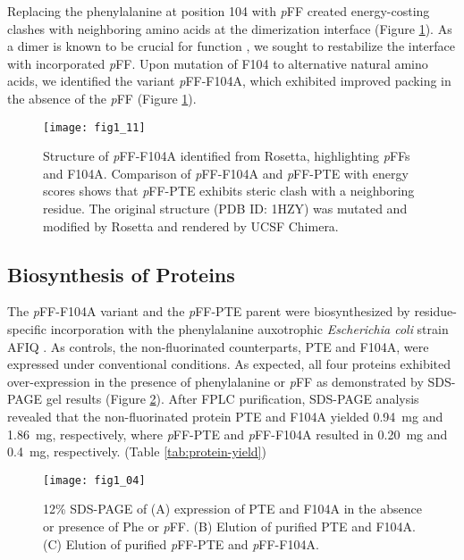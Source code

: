 \begin{refsection}
Replacing the phenylalanine at position 104 with \emph{p}FF created
energy-costing clashes with neighboring amino acids at the dimerization
interface (Figure \ref{fig:rosetta-pte}). As a dimer is known to be crucial for
function \cite{Baker2011b}, we sought to restabilize the interface with
incorporated \emph{p}FF. Upon mutation of F104 to alternative natural amino
acids, we identified the variant \emph{p}FF-F104A, which exhibited improved
packing in the absence of the \emph{p}FF (Figure \ref{fig:rosetta-pte}).
\begin{figure}[htbp] \centering \texttt{[image: fig1\_11]}
    \caption[Structure of \emph{p}FF-F104A identified from Rosetta,
        highlighting \emph{p}FFs and F104A. Comparison of \emph{p}FF-F104A and
        \emph{p}FF-PTE with energy scores shows that \emph{p}FF-PTE exhibits
        steric clash with a neighboring residue.  The original structure (PDB
        ID: 1HZY) was mutated and modified by Rosetta and rendered by UCSF
    Chimera.]{Structure of \emph{p}FF-F104A identified from Rosetta,
    highlighting \emph{p}FFs and F104A. Comparison of \emph{p}FF-F104A and
    \emph{p}FF-PTE with energy scores shows that \emph{p}FF-PTE exhibits steric
    clash with a neighboring residue. The original structure (PDB ID: 1HZY) was
    mutated and modified by Rosetta and rendered by UCSF Chimera.}
    \label{fig:rosetta-pte}
\end{figure}

\subsection{Biosynthesis of Proteins}

The \emph{p}FF-F104A variant and the \emph{p}FF-PTE parent were biosynthesized
by residue-specific incorporation with the phenylalanine auxotrophic
\emph{Escherichia coli} strain AFIQ \cite{Yang2014a}. As controls, the
non-fluorinated counterparts, PTE and F104A, were expressed under conventional
conditions. As expected, all four proteins exhibited over-expression in the
presence of phenylalanine or \emph{p}FF as demonstrated by SDS-PAGE gel results (Figure
\ref{fig:sds-gel}). After FPLC purification, SDS-PAGE analysis revealed that
the non-fluorinated protein PTE and F104A yielded \SI{0.94}{\mg} and
\SI{1.86}{\mg}, respectively, where \emph{p}FF-PTE and \emph{p}FF-F104A resulted in
\SI{0.20}{\mg} and \SI{0.4}{\mg}, respectively. (Table \ref{tab:protein-yield})
\begin{figure}[htbp] \centering \texttt{[image: fig1\_04]}
    \caption[12\% SDS-PAGE of (A) expression of PTE and
    F104A; (B) purified PTE and F104A; and (C) purified \emph{p}FF-PTE and
\emph{p}FF-F104A.]{12\% SDS-PAGE of (A) expression of PTE and F104A in the
    absence or presence of Phe or \emph{p}FF. (B) Elution of purified PTE and
    F104A. (C) Elution of purified \emph{p}FF-PTE and \emph{p}FF-F104A.}
    \label{fig:sds-gel}
\end{figure}


\end{refsection}
